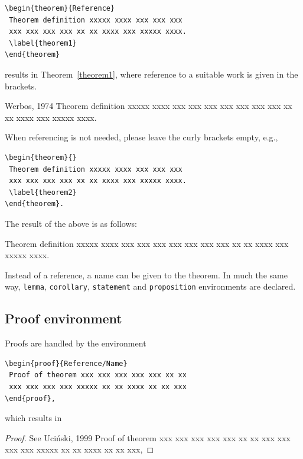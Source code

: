 \documentclass{amcs}
\begin{document}
{\small \begin{verbatim}
\begin{theorem}{Reference}
 Theorem definition xxxxx xxxx xxx xxx xxx
 xxx xxx xxx xxx xx xx xxxx xxx xxxxx xxxx.
 \label{theorem1}
\end{theorem}
\end{verbatim}}
\noindent results in Theorem~\ref{theorem1}, where reference to a suitable work is given in the brackets.

\medskip
\begin{theorem}{Werbos, 1974}
Theorem definition xxxxx xxxx xxx xxx xxx
xxx xxx xxx xxx xx xx xxxx xxx xxxxx xxxx.
 \label{theorem1}
\end{theorem}

\medskip\noindent
When referencing is not needed, please leave the curly brackets empty, e.g.,
{\small \begin{verbatim}
\begin{theorem}{}
 Theorem definition xxxxx xxxx xxx xxx xxx
 xxx xxx xxx xxx xx xx xxxx xxx xxxxx xxxx.
 \label{theorem2}
\end{theorem}.
\end{verbatim}}

\noindent
The result of the above is as follows:

\begin{theorem}{}
 Theorem definition xxxxx xxxx xxx xxx xxx
 xxx xxx xxx xxx xx xx xxxx xxx xxxxx xxxx.
 \label{theorem2}
\end{theorem}

\medskip \noindent

Instead of a reference, a name can be given to the theorem. In much the same way, \verb+lemma+, \verb+corollary+, \verb+statement+ and \verb+proposition+ environments are declared.

\subsection{Proof environment}
Proofs are handled by the environment
{\small \begin{verbatim}
\begin{proof}{Reference/Name}
 Proof of theorem xxx xxx xxx xxx xxx xx xx
 xxx xxx xxx xxx xxxxx xx xx xxxx xx xx xxx
\end{proof},
\end{verbatim}}

\noindent which results in

\begin{proof}{See Uci\'nski, 1999}
 Proof of theorem xxx xxx xxx xxx xxx xx xx
 xxx xxx xxx xxx xxxxx xx xx xxxx xx xx xxx,
\end{proof}
\end{document}
